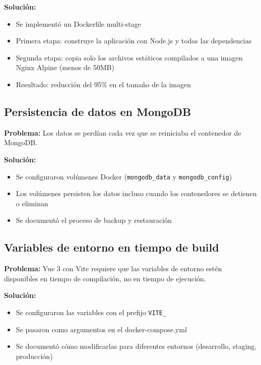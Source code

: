 \documentclass[12pt,a4paper]{article}
\begin{document}
\textbf{Solución:}
\begin{itemize}
    \item Se implementó un Dockerfile multi-stage
    \item Primera etapa: construye la aplicación con Node.js y todas las dependencias
    \item Segunda etapa: copia solo los archivos estáticos compilados a una imagen Nginx Alpine (menos de 50MB)
    \item Resultado: reducción del 95\% en el tamaño de la imagen
\end{itemize}

\subsection{Persistencia de datos en MongoDB}

\textbf{Problema:} Los datos se perdían cada vez que se reiniciaba el contenedor de MongoDB.

\textbf{Solución:}
\begin{itemize}
    \item Se configuraron volúmenes Docker (\texttt{mongodb\_data} y \texttt{mongodb\_config})
    \item Los volúmenes persisten los datos incluso cuando los contenedores se detienen o eliminan
    \item Se documentó el proceso de backup y restauración
\end{itemize}

\subsection{Variables de entorno en tiempo de build}

\textbf{Problema:} Vue 3 con Vite requiere que las variables de entorno estén disponibles en tiempo de compilación, no en tiempo de ejecución.

\textbf{Solución:}
\begin{itemize}
    \item Se configuraron las variables con el prefijo \texttt{VITE\_}
    \item Se pasaron como argumentos en el docker-compose.yml
    \item Se documentó cómo modificarlas para diferentes entornos (desarrollo, staging, producción)
\end{itemize}

\newpage

\end{document}
